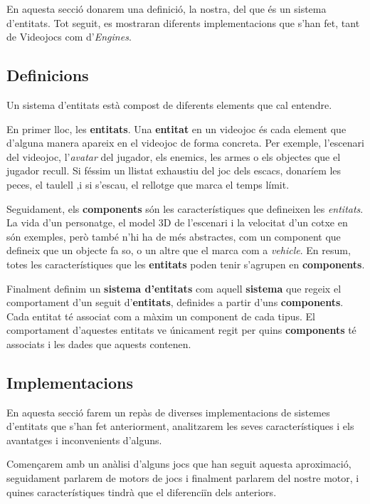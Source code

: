 En aquesta secció donarem una definició, la nostra, del que és un sistema d'entitats. Tot seguit, es mostraran diferents implementacions que s'han fet, tant de Videojocs com d'{\em Engines}.

\subsection{Definicions}

Un sistema d'entitats està compost de diferents elements que cal entendre.

En primer lloc, les {\bf entitats}. Una {\bf entitat} en un videojoc és cada element que d'alguna manera apareix en el videojoc de forma concreta. Per exemple, l'escenari del videojoc, l'{\em avatar} del jugador, els enemics, les armes o els objectes que el jugador recull. Si féssim un llistat exhaustiu del joc dels escacs, donaríem les peces, el taulell ,i si s'escau, el rellotge que marca el temps límit.

Seguidament, els {\bf components} són les característiques que defineixen les {\em entitats}. La vida d'un personatge, el model 3D de l'escenari i la velocitat d'un cotxe en són exemples, però també n'hi ha de més abstractes, com un component que defineix que un objecte fa so, o un altre que el marca com a {\em vehicle}. En resum, totes les característiques que les {\bf entitats} poden tenir s'agrupen en {\bf components}.

Finalment definim un {\bf sistema d'entitats} com aquell {\bf sistema} que regeix el comportament d'un seguit d'{\bf entitats}, definides a partir d'uns {\bf components}. Cada entitat té associat com a màxim un component de cada tipus. El comportament d'aquestes entitats ve únicament regit per quins {\bf components} té associats i les dades que aquests contenen.

\subsection{Implementacions}

En aquesta secció farem un repàs de diverses implementacions de sistemes d'entitats que s'han fet anteriorment, analitzarem les seves característiques i els avantatges i inconvenients d'alguns.

Començarem amb un anàlisi d'alguns jocs que han seguit aquesta aproximació, seguidament parlarem de motors de jocs i finalment parlarem del nostre motor, i quines característiques tindrà que el diferenciïn dels anteriors.

